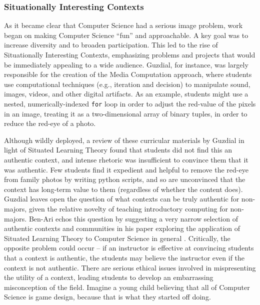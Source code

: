 \subsubsection{Situationally Interesting Contexts}

As it became clear that Computer Science had a serious image problem, work began on making Computer Science ``fun'' and approachable. 
A key goal was to increase diversity and to broaden participation. 
This led to the rise of Situationally Interesting Contexts, emphasizing problems and projects that would be immediately appealing to a wide audience.
Guzdial, for instance, was largely responsible for the creation of the Media Computation approach, where students use computational techniques (e.g., iteration and decision) to manipulate sound, images, videos, and other digital artifacts.
As an example, students might use a nested, numerically-indexed \texttt{for} loop in order to adjust the red-value of the pixels in an image, treating it as a two-dimensional array of binary tuples, in order to reduce the red-eye of a photo.

Although wildly deployed, a review of these curricular materials by Guzdial \cite{guzdial2006imagineering} in light of Situated Learning Theory found that students did not find this an authentic context, and intense rhetoric was insufficient to convince them that it was authentic. 
Few students find it expedient and helpful to remove the red-eye from family photos by writing python scripts, and so are unconvinced that the context has long-term value to them (regardless of whether the content does).
Guzdial leaves open the question of what contexts can be truly authentic for non-majors, given the relative novelty of teaching introductory computing for non-majors.
Ben-Ari echos this question by suggesting a very narrow selection of authentic contexts and communities in his paper exploring the application of Situated Learning Theory to Computer Science in general \cite{ben2004situated}.
Critically, the opposite problem could occur -- if an instructor is effective at convincing students that a context is authentic, the students may believe the instructor even if the context is not authentic.
There are serious ethical issues involved in mispresenting the utility of a context, leading students to develop an embarrassing misconception of the field. Imagine a young child believing that all of Computer Science is game design, because that is what they started off doing.

